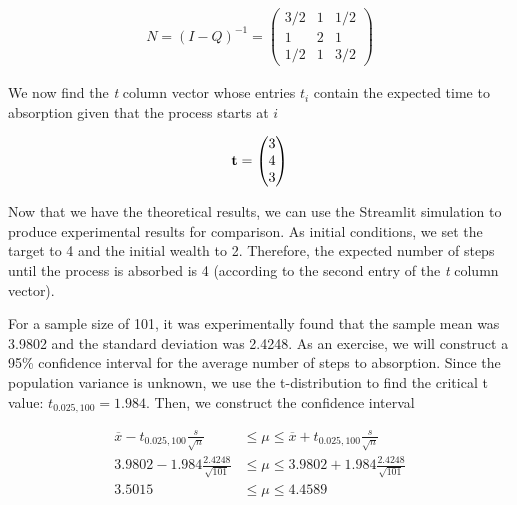 \documentclass[a4paper,12pt]{article}
\theoremstyle{definition}
\let\oldtextbf\mathbf
\renewcommand{\mathbf}[1]{\oldtextbf{\boldmath #1}}
\begin{document}
	\begin{equation}
		\begin{aligned}
        	N = (I-Q)^{-1} = 
           \begin{pmatrix}
                3/2 & 1 & 1/2 \\ 
                1   & 2 & 1   \\
                1/2 & 1 & 3/2  
            \end{pmatrix}
		\end{aligned}
	\end{equation}

We now find the \emph{t} column vector whose entries $t_i$ contain the expected time to absorption given that the process starts 
at $i$

	\begin{equation}
		\begin{aligned}
			\mathbf{t} =
			\begin{pmatrix}
					3 \\
					4 \\
					3 \\
				\end{pmatrix}
			\end{aligned}
	\end{equation}

Now that we have the theoretical results, we can use the Streamlit simulation to produce experimental results for comparison. 
As initial conditions, we set the target to 4 and the initial wealth to 2. Therefore, the expected number of steps until the process is absorbed is 4 (according to the second entry of the \emph{t} column vector).

For a sample size of 101, it was experimentally found that the sample mean was 3.9802 and the standard deviation was 2.4248.
As an exercise, we will construct a 95\% confidence interval for the average number of steps to absorption. Since the population variance is unknown, we use the t-distribution to find the critical t value: $t_{0.025,100} = 1.984$. Then, we construct the confidence interval

	\begin{equation*}
		\begin{aligned}
		 \overline{x} - t_{0.025,100}\frac{s}{\sqrt{n}} &\leq \mu \leq \overline{x} + t_{0.025,100} \frac{s}{\sqrt{n}} \\
		 3.9802 - 1.984\frac{2.4248}{\sqrt{101}} &\leq \mu \leq 3.9802 + 1.984\frac{2.4248}{\sqrt{101}} \\
		 3.5015 &\leq \mu \leq 4.4589
		\end{aligned}
	\end{equation*}
\end{document}
